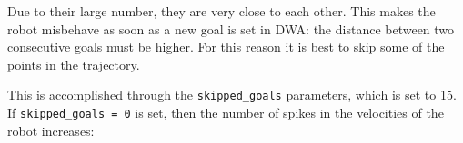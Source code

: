 \documentclass[11pt,a4paper]{article}
\begin{document}
Due to their large number, they are very close to each other. This makes the robot misbehave as soon as
a new goal is set in DWA: the distance between two consecutive goals must be higher.
For this reason it is best to skip some of the points in the trajectory.

This is accomplished through the \texttt{skipped\_goals} parameters, which is set to 15.\\

If \texttt{skipped\_goals = 0} is set, then the number of spikes in the velocities of the robot increases:
\begin{figure}[H]
    \centering
    \quad
\end{figure}
\end{document}
